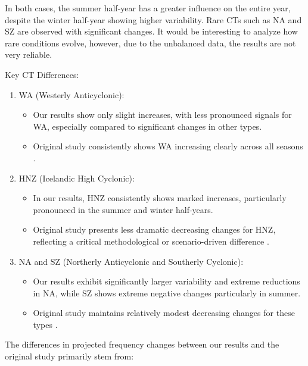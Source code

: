 \documentclass[
]{krantz}
\providecommand{\tightlist}{%
  \setlength{\itemsep}{0pt}\setlength{\parskip}{0pt}}
\begin{document}
In both cases, the summer half-year has a greater influence on the entire year, despite the winter half-year showing higher variability.
Rare CTs such as NA and SZ are observed with significant changes.
It would be interesting to analyze how rare conditions evolve,
however, due to the unbalanced data, the results are not very reliable.

Key CT Differences:

\begin{enumerate}
\def\labelenumi{\arabic{enumi}.}
\tightlist
\item
  WA (Westerly Anticyclonic):

  \begin{itemize}
  \tightlist
  \item
    Our results show only slight increases, with less pronounced signals for WA, especially compared to significant changes in other types.
  \item
    Original study consistently shows WA increasing clearly across all seasons \citep{Mittermeier2022}.
  \end{itemize}
\item
  HNZ (Icelandic High Cyclonic):

  \begin{itemize}
  \tightlist
  \item
    In our results, HNZ consistently shows marked increases, particularly pronounced in the summer and winter half-years.
  \item
    Original study presents less dramatic decreasing changes for HNZ, reflecting a critical methodological or scenario-driven difference \citep{Mittermeier2022}.
  \end{itemize}
\item
  NA and SZ (Northerly Anticyclonic and Southerly Cyclonic):

  \begin{itemize}
  \tightlist
  \item
    Our results exhibit significantly larger variability and extreme reductions in NA, while SZ shows extreme negative changes particularly in summer.
  \item
    Original study maintains relatively modest decreasing changes for these types \citep{Mittermeier2022}.
  \end{itemize}
\end{enumerate}

The differences in projected frequency changes between our results and the original study primarily stem from:
\end{document}
